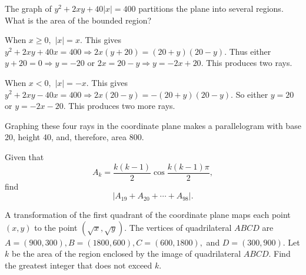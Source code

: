 \documentclass[11pt]{article}
\theoremstyle{definition}
\begin{document}
%	












\begin{question}[name={1998 AIME, \href{https://artofproblemsolving.com/community/c4p392262}{Problem 3}}]
	The graph of $y^2+2xy+40|x|=400$ partitions the plane into several regions. What is the area of the bounded region?
\end{question}


\begin{solution}[name={Solution by joml88}]
	When $x\ge 0,$ $|x|=x.$ This gives $y^2+2xy+40x=400\Rightarrow 2x(y+20)=(20+y)(20-y).$ Thus either $y+20=0\Rightarrow y=-20$ or $2x=20-y\Rightarrow y=-2x+20.$ This produces two rays.
	
	When $x<0,$ $|x|=-x$. This gives $y^2+2xy-40x=400\Rightarrow 2x(20-y)=-(20+y)(20-y).$ So either $y=20$ or $y=-2x-20.$ This produces two more rays.
	
	Graphing these four rays in the coordinate plane makes a parallelogram with base 20, height 40, and, therefore, area 800.
\end{solution}













\begin{question}[name={1998 AIME, \href{https://artofproblemsolving.com/community/c4p392265}{Problem 5}}]
	Given that $$A_k=\frac{k(k-1)}2\cos\frac{k(k-1)\pi}2,$$ find $$|A_{19}+A_{20}+\cdots+A_{98}|.$$
\end{question}

%
%	





\begin{question}[name={1999 AIME, \href{https://artofproblemsolving.com/community/c4p392214}{Problem 6}}]
	A transformation of the first quadrant of the coordinate plane maps each point $(x,y)$ to the point $(\sqrt{x},\sqrt{y}).$ The vertices of quadrilateral $ABCD$ are $A=(900,300), B=(1800,600), C=(600,1800),$ and $D=(300,900).$ Let $k$ be the area of the region enclosed by the image of quadrilateral $ABCD.$ Find the greatest integer that does not exceed $k$.
\end{question}
\end{document}
